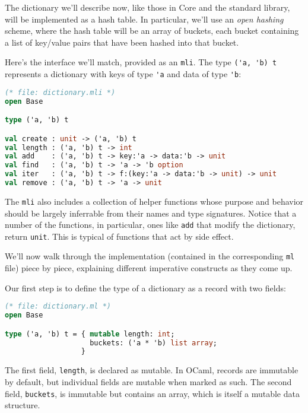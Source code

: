The dictionary we'll describe now, like those in Core and the standard
library, will be implemented as a hash table. In particular, we'll use
an \emph{open hashing} scheme, where the hash table will be an array of
buckets, each bucket containing a list of key/value pairs that have been
hashed into that bucket. 

Here's the interface we'll match, provided as an
\passthrough{\lstinline!mli!}. The type
\passthrough{\lstinline!('a, 'b) t!} represents a dictionary with keys
of type \passthrough{\lstinline!'a!} and data of type
\passthrough{\lstinline!'b!}:

\begin{lstlisting}[language=Caml]
(* file: dictionary.mli *)
open Base

type ('a, 'b) t

val create : unit -> ('a, 'b) t
val length : ('a, 'b) t -> int
val add    : ('a, 'b) t -> key:'a -> data:'b -> unit
val find   : ('a, 'b) t -> 'a -> 'b option
val iter   : ('a, 'b) t -> f:(key:'a -> data:'b -> unit) -> unit
val remove : ('a, 'b) t -> 'a -> unit
\end{lstlisting}

The \passthrough{\lstinline!mli!} also includes a collection of helper
functions whose purpose and behavior should be largely inferrable from
their names and type signatures. Notice that a number of the functions,
in particular, ones like \passthrough{\lstinline!add!} that modify the
dictionary, return \passthrough{\lstinline!unit!}. This is typical of
functions that act by side effect.

We'll now walk through the implementation (contained in the
corresponding \passthrough{\lstinline!ml!} file) piece by piece,
explaining different imperative constructs as they come up.

Our first step is to define the type of a dictionary as a record with
two fields:

\begin{lstlisting}[language=Caml]
(* file: dictionary.ml *)
open Base

type ('a, 'b) t = { mutable length: int;
                    buckets: ('a * 'b) list array;
                  }
\end{lstlisting}

The first field, \passthrough{\lstinline!length!}, is declared as
mutable. In OCaml, records are immutable by default, but individual
fields are mutable when marked as such. The second field,
\passthrough{\lstinline!buckets!}, is immutable but contains an array,
which is itself a mutable data structure. 

